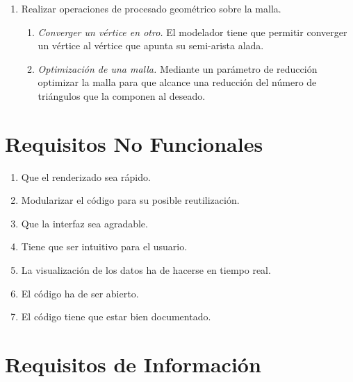 \begin{enumerate}[label=\textbf{\textit{RF-\arabic*}},ref=RF-\arabic*]
\begin{enumerate}[label*=\textbf{\textit{.\arabic*}}]
	\end{enumerate}
			
	
	\item Realizar operaciones de procesado geométrico sobre la malla.
		\begin{enumerate}[label*=\textbf{\textit{.\arabic*}}]
		\item \textit{Converger un vértice en otro.} El modelador tiene que permitir converger un vértice al vértice que apunta su semi-arista alada.
		\item \textit{Optimización de una malla.} Mediante un parámetro de reducción optimizar la malla para que alcance una reducción del número de triángulos que la componen al deseado.
		\end{enumerate}	
	
\end{enumerate}


\section{ Requisitos No Funcionales}


\begin{enumerate}[label=\textbf{\textit{RNF-\arabic*}},ref=RNF-\arabic*]
	\item Que el renderizado sea rápido.
	\item Modularizar el código para su posible reutilización.
	\item Que la interfaz sea agradable.
	\item Tiene que ser intuitivo para el usuario.
	\item La visualización de los datos ha de hacerse en tiempo real.
	\item El código ha de ser abierto.
	\item El código tiene que estar bien documentado.
	
	
	
\end{enumerate}

\section{ Requisitos de Información}


